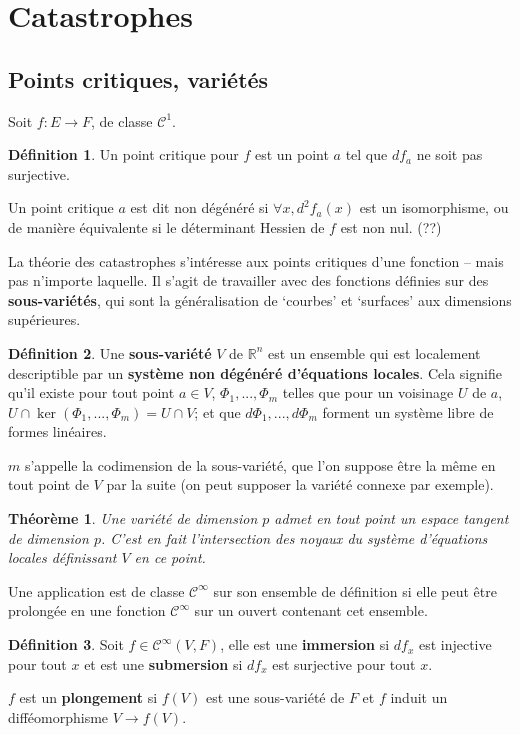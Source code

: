 \documentclass{article}
\newcommand{\cun}{\mathcal{C}^1}
\newcommand{\cinf}{\mathcal{C}^\infty}
\newcommand{\R}{\mathbb{R}}
\newtheorem{thm}{Théorème}
\theoremstyle{definition}
\newtheorem{defn}{Définition}
\begin{document}
\section{Catastrophes}

\subsection{Points critiques, variétés}

Soit $f:E\to F$, de classe $\cun$.
\begin{defn}
	Un point critique pour $f$ est un point $a$ tel que $df_a$ ne soit pas surjective.

	Un point critique $a$ est dit non dégénéré si $\forall x, d^2f_a(x)$ est un isomorphisme, ou de manière équivalente si le déterminant Hessien de $f$ est non nul. (??)
\end{defn}

La théorie des catastrophes s'intéresse aux points critiques d'une fonction -- mais pas n'importe laquelle.
Il s'agit de travailler avec des fonctions définies sur des \textbf{sous-variétés}, qui sont la généralisation de `courbes' et `surfaces' aux dimensions supérieures.

\begin{defn}
	Une \textbf{sous-variété} $V$ de $\R^n$ est un ensemble qui est localement descriptible par un \textbf{système non dégénéré d'équations locales}.
	Cela signifie qu'il existe pour tout point $a\in V$, $\Phi_1,...,\Phi_m$ telles que pour un voisinage $U$ de $a$, $U\cap\ker(\Phi_1,...,\Phi_m)=U\cap V$; et que $d\Phi_1,...,d\Phi_m$ forment un système libre de formes linéaires.

	$m$ s'appelle la codimension de la sous-variété, que l'on suppose être la même en tout point de $V$ par la suite (on peut supposer la variété connexe par exemple).
\end{defn}

\begin{thm}
	Une variété de dimension $p$ admet en tout point un espace tangent de dimension $p$.
	C'est en fait l'intersection des noyaux du système d'équations locales définissant $V$ en ce point.
\end{thm}

Une application est de classe $\cinf$ sur son ensemble de définition si elle peut être prolongée en une fonction $\cinf$ sur un ouvert contenant cet ensemble.

\begin{defn}
	Soit $f\in\cinf(V,F)$, elle est une \textbf{immersion} si $df_x$ est injective pour tout $x$ et est une \textbf{submersion} si $df_x$ est surjective pour tout $x$.

	$f$ est un \textbf{plongement} si $f(V)$ est une sous-variété de $F$ et $f$ induit un difféomorphisme $V\to f(V)$.
\end{defn}
\end{document}
